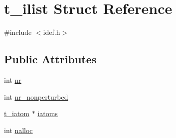 \hypertarget{structt__ilist}{\section{t\-\_\-ilist \-Struct \-Reference}
\label{structt__ilist}
}


{\ttfamily \#include $<$idef.\-h$>$}

\subsection*{\-Public \-Attributes}
\begin{DoxyCompactItemize}
\item 
int \hyperlink{structt__ilist_a668c23bce84b890f293861e894940ff4}{nr}
\item 
int \hyperlink{structt__ilist_a197723fecd0a3fc1698e73364ab2876d}{nr\-\_\-nonperturbed}
\item 
\hyperlink{include_2types_2idef_8h_abb1c069d34f868f1fa980a4c131ba249}{t\-\_\-iatom} $\ast$ \hyperlink{structt__ilist_ad8dfbd1f8033ab37ac311f235078c5c8}{iatoms}
\item 
int \hyperlink{structt__ilist_a2e267308cd95280f6a5f4bbe296dacf5}{nalloc}
\end{DoxyCompactItemize}



